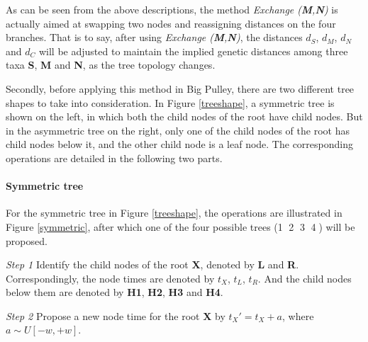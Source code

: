 \documentclass{bmcart}
\begin{document}
As can be seen from the above descriptions, the method \textit{Exchange (\textbf{M},\textbf{N})} is actually aimed at swapping two nodes and reassigning distances on the four branches. That is to say, after using \textit{Exchange (\textbf{M},\textbf{N})}, the distances $d_S$, $d_{M}$, $d_{N}$ and $d_{C}$ will be adjusted to maintain the implied genetic distances among three taxa \textbf{S}, \textbf{M} and \textbf{N}, as the tree topology changes. 

Secondly, before applying this method in Big Pulley, there are two different tree shapes to take into consideration. In Figure \ref{treeshape}, a symmetric tree is shown on the left, in which both the child nodes of the root have child nodes. But in the asymmetric tree on the right, only one of the child nodes of the root has child nodes below it, and the other child node is a leaf node. The corresponding operations are detailed in the following two parts.
\paragraph*{Symmetric tree}

For the symmetric tree in Figure \ref{treeshape}, the operations are illustrated in Figure \ref{symmetric}, after which one of the four possible trees (\textcircled1 \textcircled2 \textcircled3 \textcircled4) will be proposed.

\emph{Step 1} Identify the child nodes of the root \textbf{X}, denoted by \textbf{L} and \textbf{R}. Correspondingly, the node times are denoted by $t_X$, $t_L$, $t_R$. And the child nodes below them are denoted by \textbf{H1}, \textbf{H2}, \textbf{H3} and \textbf{H4}. 

\emph{Step 2} Propose a new node time for the root \textbf{X} by ${t_X}' = {t_X} + a$, where $a \sim U[ - w, + w]$.
\end{document}

